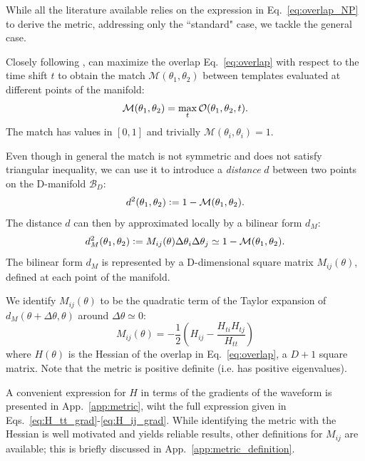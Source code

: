 \documentclass[twocolumn,showpacs,preprintnumbers,nofootinbib,prd,
superscriptaddress,10pt]{revtex4-2}
\begin{document}
While all the literature available \cite{owen_metric, Messenger:2008ta, Prix:2007ks, Brown:2012qf, Roy:2017oul, Coogan:2022qxs, Hanna:2022zpk} relies on the expression in Eq.~\eqref{eq:overlap_NP} to derive the metric, addressing only the ``standard" case, we tackle the general case.

Closely following \cite{owen_metric}, can maximize the overlap Eq.~\eqref{eq:overlap} with respect to the time shift $t$ to obtain the match $\mathcal{M}(\theta_1,\theta_2)$ between templates evaluated at different points of the manifold:
\begin{equation}\label{eq:match}
	\mathcal{M}(\theta_1,\theta_2) = \max_t \mathcal{O}(\theta_1,\theta_2, t). \\
\end{equation}
%
The match has values in $[0,1]$ and trivially $\mathcal{M}(\theta_i,\theta_i) = 1$.

Even though in general the match is not symmetric and does not satisfy triangular inequality, we can use it to introduce a {\it distance} $d$ between two points on the D-manifold $\mathcal{B}_D$:
\begin{align}\label{eq:distance}
	d^2(\theta_1,\theta_2) \vcentcolon= 1 - \mathcal{M}(\theta_1,\theta_2).
\end{align}
The distance $d$ can then by approximated locally by a bilinear form $d_M$:
\begin{align}\label{eq:metric_definition}
	d_M^2(\theta_1,\theta_2) \vcentcolon= M_{ij}(\theta) \Delta\theta_i \Delta\theta_j \simeq 1 - \mathcal{M}(\theta_1,\theta_2).
\end{align}
The bilinear form $d_M$ is represented by a D-dimensional square matrix $M_{ij}(\theta)$, defined at each point of the manifold.

We identify $M_{ij}(\theta)$ to be the quadratic term of the Taylor expansion of ${d_M(\theta+\Delta\theta,\theta)}$ around $\Delta\theta\simeq 0$:
\begin{equation}\label{eq:metric_expression}
	M_{ij}(\theta) = - \frac{1}{2} \left( H_{ij} - \frac{H_{ti}H_{tj}}{H_{tt}} \right)
\end{equation}
where $H(\theta)$ is the Hessian of the overlap in Eq.~\eqref{eq:overlap}, a $D+1$ square matrix.
Note that the metric is positive definite (i.e. has positive eigenvalues).

A convenient expression for $H$ in terms of the gradients of the waveform is presented in App.~\ref{app:metric}, wiht the full expression given in Eqs.~\eqref{eq:H_tt_grad}-\eqref{eq:H_ij_grad}.
While identifying the metric with the Hessian is well motivated and yields reliable results, other definitions for $M_{ij}$ are available; this is briefly discussed in App.~\ref{app:metric_definition}.
\end{document}
